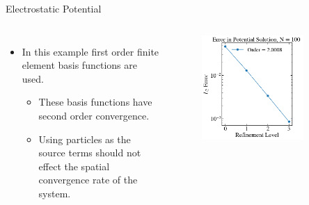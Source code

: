 \documentclass[aspectratio=169, 16pt]{beamer}
\begin{document}
\begin{frame}{Electrostatic Potential}
  \vfill{}
  \begin{columns}
    \begin{itemize}
      \item In this example first order finite element basis functions are used. 
      \begin{itemize}
        \item These basis functions have second order convergence. 
        \item Using particles as the source terms should not effect the spatial convergence rate of the system.
      \end{itemize}
    \end{itemize}
    \begin{figure}[H]
      \includegraphics[width=0.8\textwidth]{figs/potential_error.png}
     \end{figure}
  \end{columns}
\end{frame}
\end{document}
